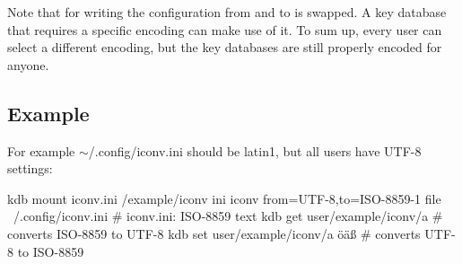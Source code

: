 Note that for writing the configuration {\ttfamily from} and {\ttfamily to} is swapped. A key database that requires a specific encoding can make use of it. To sum up, every user can select a different encoding, but the key databases are still properly encoded for anyone.

\subsection*{Example}

For example $\sim$/.config/iconv.\+ini should be latin1, but all users have U\+T\+F-\/8 settings\+: \begin{DoxyVerb}    kdb mount iconv.ini /example/iconv ini iconv from=UTF-8,to=ISO-8859-1
    file ~/.config/iconv.ini             # iconv.ini: ISO-8859 text
    kdb get user/example/iconv/a     # converts ISO-8859 to UTF-8
    kdb set user/example/iconv/a öäß # converts UTF-8 to ISO-8859\end{DoxyVerb}
 